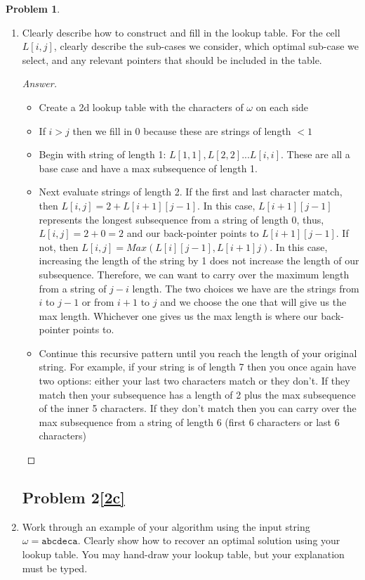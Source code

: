 \documentclass[11pt]{article}
\theoremstyle{definition}
\theoremstyle{definition}
\newtheorem{required}{Problem}
\theoremstyle{definition}
\begin{document}
\begin{required}
\begin{enumerate}[label=(\alph*)]
\newpage
\subsection{Problem 2\ref{2b}}
\item \label{2b} Clearly describe how to construct and fill in the lookup table. For the cell $L[i, j]$, clearly describe the sub-cases we consider, which optimal sub-case we select, and any relevant pointers that should be included in the table.

\begin{proof}[Answer] $ $\\
\begin{itemize}
    \item Create a 2d lookup table with the characters of $\omega$ on each side
    \item If $i > j$ then we fill in 0 because these are strings of length $< 1$
    \item Begin with string of length 1: $L[1,1],L[2,2]...L[i,i]$. These are all a base case and have a max subsequence of length 1. 
    \item Next evaluate strings of length 2. If the first and last character match, then $L[i,j]=2 + L[i+1][j-1]$. In this case, $L[i+1][j-1]$ represents the longest subsequence from a string of length 0, thus, $L[i,j]=2 + 0 = 2$ and our back-pointer points to $L[i+1][j-1]$. If not, then $L[i,j] = Max(L[i][j-1], L[i+1]j)$. In this case, increasing the length of the string by 1 does not increase the length of our subsequence. Therefore, we can want to carry over the maximum length from a string of $j-i$ length. The two choices we have are the strings from $i$ to $j-1$ or from $i+1$ to $j$ and we choose the one that will give us the max length. Whichever one gives us the max length is where our back-pointer points to. 
    \item Continue this recursive pattern until you reach the length of your original string. For example, if your string is of length 7 then you once again have two options: either your last two characters match or they don't. If they match then your subsequence has a length of 2 plus the max subsequence of the inner 5 characters. If they don't match then you can carry over the max subsequence from a string of length 6 (first 6 characters or last 6 characters) 
\end{itemize}
\end{proof}



\newpage
\subsection{Problem 2\ref{2c}}
\item \label{2c} Work through an example of your algorithm using the input string $\omega = \texttt{abcdeca}$. Clearly show how to recover an optimal solution using your lookup table. You may hand-draw your lookup table, but your explanation must be typed.


\end{enumerate}
\end{required}
\end{document}
